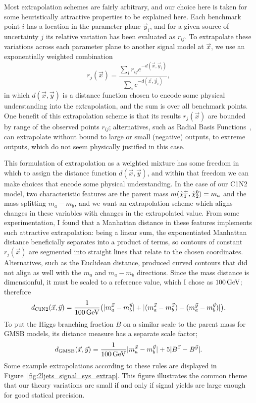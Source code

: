 Most extrapolation schemes are fairly arbitrary, and our choice here is taken
for some heuristically attractive properties to be explained here.
Each benchmark point $i$ has a location in the parameter plane $\vec y_i$, and
for a given source of uncertainty $j$ its relative variation has been evaluated
as $r_{ij}$.
To extrapolate these variations across each parameter plane to another signal
model at $\vec x$, we use an exponentially weighted combination
\begin{equation}
\label{eqn:2ljets_signal_extrap}
r_j(\vec x) = \frac{
\sum_i r_{ij} e^{-d(\vec x, \vec y_i)}
}{
\sum_i e^{-d(\vec x, \vec y_i)}
}
,
\end{equation}
in which $d(\vec x, \vec y)$ is a distance function chosen to encode some
physical understanding into the extrapolation, and the sum is over all
benchmark points.
One benefit of this extrapolation scheme is that its results $r_j(\vec x)$
are bounded by range of the observed points $r_{ij}$;
alternatives, such as Radial Basis
Functions~\cite{2020SciPy-NMeth,fasshauer2007meshfree}, can extrapolate without
bound to large or small (negative) outputs, to extreme outputs, which do not
seem physically justified in this case.

This formulation of extrapolation as a weighted mixture has some freedom in
which to assign the distance function $d(\vec x, \vec y)$, and within that
freedom we can make choices that encode some physical understanding.
In the case of our C1N2 model, two characteristic features are the
parent mass $m(\chargino_1, \neutralino_2) = m_a$
and the mass splitting $m_a - m_b$, and we want an extrapolation scheme which
aligns changes in these variables with changes in the extrapolated value.
From some experimentation, I found that a Manhattan distance in these features
implements such attractive extrapolation:
being a linear sum, the exponentiated Manhattan distance beneficially
separates into a product of terms, so contours of constant $r_j(\vec x)$ are
segmented into straight lines that relate to the chosen coordinates.
Alternatives, such as the Euclidean distance, produced curved contours that did
not align as well with the $m_a$ and $m_a - m_b$ directions.
Since the mass distance is dimensionful, it must be scaled to a reference
value, which I chose as $100\,\eV[G]$; therefore
\begin{equation}
d_\mathrm{C1N2}(\vec x, \vec y) =
\frac{1}{100\,\eV[G]}
\big(
|m_a^{\vec x} - m_b^{\vec y}|
+
|(m_a^{\vec x} - m_b^{\vec x}) - (m_a^{\vec y} - m_b^{\vec y})|
\big)
.
\end{equation}
To put the Higgs branching fraction $B$ on a similar scale to the parent mass
for GMSB models, its distance measure has a separate scale factor;
\begin{equation}
d_\mathrm{GMSB}(\vec x, \vec y) =
\frac{1}{100\,\eV[G]}
|m_a^{\vec x} - m_b^{\vec y}|
+
5
|B^{\vec x} - B^{\vec y}|
.
\end{equation}
Some example extrapolations according to these rules are displayed in
Figure~\ref{fig:2ljets_signal_sys_extrap}.
This figure illustrates the common theme that our theory variations are small
if and only if signal yields are large enough for good statical precision.

